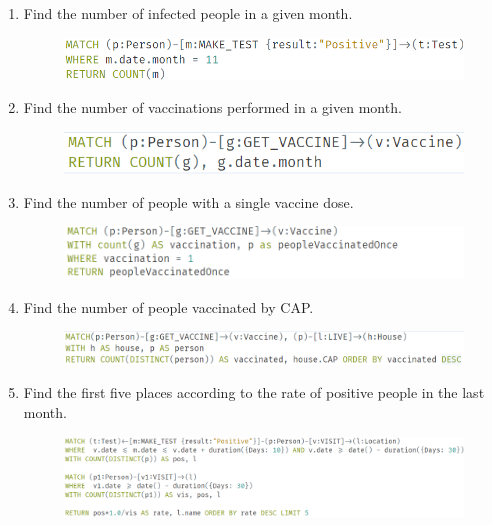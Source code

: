 \begin{enumerate}[leftmargin=*,label=\textbf{\thesection.\arabic*}]
\begin{figure}[h]
    \end{figure} 
    \item Find the number of infected people in a given month.
    \begin{figure}[h]
    \centering
        \includegraphics[width=\textwidth]{images/positives_given_month.png}
    \end{figure} 
    \item Find the number of vaccinations performed in a given month.
    \begin{figure}[h]
        \includegraphics[scale = 0.7]{images/vaccination_given_month.png}
    \end{figure}     
    \item Find the number of people with a single vaccine dose.
    \begin{figure}[!htb]
        \centering
        \includegraphics[scale = 0.7]{images/vaccinated_once.png}
    \end{figure} 
    \item Find the number of people vaccinated by CAP.
    \begin{figure}[!htb]
        \centering
        \includegraphics[width=\textwidth]{images/vaccinated_per_CAP.png}
    \end{figure} 
    \item Find the first five places according to the rate of positive people in the last month.
    \begin{figure}[!htb]
        \centering
        \includegraphics[width=\textwidth]{images/top_5_locations.png}

\end{figure}
\end{enumerate}
